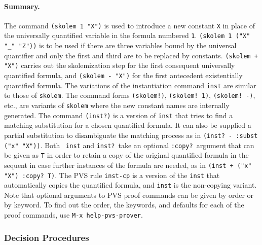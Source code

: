 
\paragraph{Summary. }
The command {\tt (skolem 1 "X")} is used to introduce a new constant
{\tt X} in place of the universally quantified variable in the formula
numbered {\tt 1}.  {\tt (skolem 1 ("X" "\_" "Z"))} is to be used if
there are three variables bound by the universal quantifier and only the
first and third are to be replaced by constants.  {\tt (skolem + "X")}
carries out the skolemization step for the first consequent universally
quantified formula, and {\tt (skolem - "X")} for the first antecedent
existentially quantified formula.  The variations of the instantiation
command {\tt inst} are similar to those of {\tt skolem}.  The command
forms {\tt (skolem!)}, {\tt (skolem! 1)}, {\tt (skolem! -)}, etc., are
variants of {\tt skolem} where the new constant names are internally
generated.  The command {\tt (inst?)} is a version of {\tt inst} that
tries to find a matching substitution for a chosen quantified formula.
It can also be supplied a partial substitution to disambiguate the
matching process as in {\tt (inst? - :subst ("x" "X"))}.  Both {\tt
inst} and {\tt inst?}\ take an optional {\tt :copy?}\ argument that can
be given as {\tt T} in order to retain a copy of the original quantified
formula in the sequent in case further instances of the formula are
needed, as in {\tt (inst + ("x" "X") :copy? T)}.  The PVS rule
{\tt inst-cp} is a version of the {\tt inst} that automatically
copies the quantified formula, and {\tt inst} is the non-copying
variant.  
Note that optional
arguments to PVS proof commands can be given by order or by keyword.
To find out the order, the keywords, and defaults for each of the proof
commands, use {\tt M-x help-pvs-prover}.

\subsubsection{Decision Procedures}

